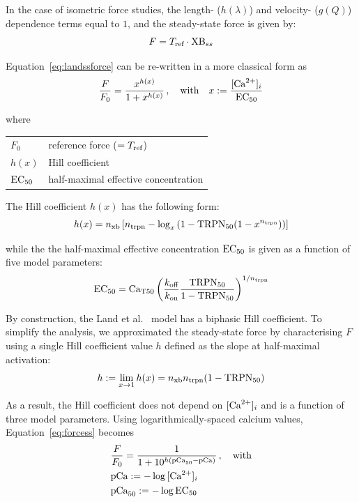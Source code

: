 \noindent
In the case of isometric force studies, the length- ($h(\lambda)$) and velocity- ($g(Q)$) dependence terms equal to $1$, and the steady-state force is given by:
%
\begin{equation}\label{eq:landssforce}
    F = T_{\textrm{ref}}\cdot \textrm{XB}_{ss}
\end{equation}

\noindent
Equation~\eqref{eq:landssforce} can be re-written in a more classical form as
%
\begin{equation}\label{eq:forcess}
    \frac{F}{F_0} = \frac{x^{h(x)}}{1+x^{h(x)}}\,,\quad\text{with}\quad x:=\frac{[\textrm{Ca}^{2+}]_{i}}{\textrm{EC}_{50}}
\end{equation}

\noindent
where

\vspace{0.2cm}
\begin{tabular}{ll}
    $F_0$  & reference force ($=T_{\textrm{ref}}$) \\
    $h(x)$ & Hill coefficient \\
    $\textrm{EC}_{50}$ & half-maximal effective concentration
\end{tabular}

\vspace{0.3cm}\noindent
The Hill coefficient $h(x)$ has the following form:
%
\begin{equation}
    h(x) = n_{\textrm{xb}}\left[n_{\textrm{trpn}}-\log_{x}{\left(1-\textrm{TRPN}_{50}(1-x^{n_{\textrm{trpn}}})\right)}\right]
\end{equation}

\noindent
while the the half-maximal effective concentration $\textrm{EC}_{50}$ is given as a function of five model parameters:
%
\begin{equation}\label{eq:ec50}
    \textrm{EC}_{50} = \textrm{Ca}_{\textrm{T}50}\left(\frac{k_{\textrm{off}}}{k_{\textrm{on}}}\frac{\textrm{TRPN}_{50}}{1-\textrm{TRPN}_{50}}\right)^{1/n_{\textrm{trpn}}}
\end{equation}

By construction, the Land et al.~\cite{Land:2012} model has a biphasic Hill coefficient. To simplify the analysis, we approximated the steady-state force by characterising $F$ using a single Hill coefficient value $h$ defined as the slope at half-maximal activation:
%
\begin{equation}\label{eq:h}
    h := \lim_{x\to1}h(x) = n_{\textrm{xb}}n_{\textrm{trpn}}(1-\textrm{TRPN}_{50})
\end{equation}

\noindent
As a result, the Hill coefficient does not depend on $[\textrm{Ca}^{2+}]_{i}$ and is a function of three model parameters. Using logarithmically-spaced calcium values, Equation~\eqref{eq:forcess} becomes
%
\begin{align}\label{eq:FpCa}
    & \frac{F}{F_0} = \frac{1}{1+10^{h(\textrm{pCa}_{50}-\textrm{pCa})}}\,,\quad\text{with} \\
    & \textrm{pCa}:=-\log{[\textrm{Ca}^{2+}]_{i}} \\
    & \textrm{pCa}_{50}:=-\log{\textrm{EC}_{50}}
\end{align}

